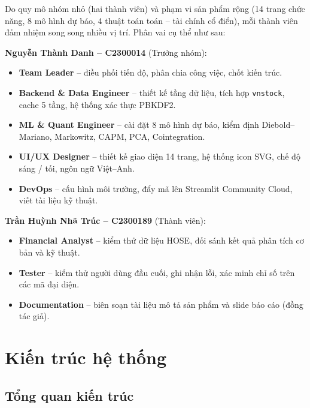 \documentclass[12pt,a4paper,openany,oneside]{report}
\numberwithin{equation}{chapter}
\begin{document}
\indent Do quy mô nhóm nhỏ (hai thành viên) và phạm vi sản phẩm rộng
(14 trang chức năng, 8 mô hình dự báo, 4 thuật toán toán -- tài chính
cổ điển), mỗi thành viên đảm nhiệm song song nhiều vị trí. Phân vai cụ
thể như sau:

\vspace{4pt}
\noindent\textbf{Nguyễn Thành Danh -- C2300014} (Trưởng nhóm):
\begin{itemize}[leftmargin=22pt,topsep=2pt,itemsep=2pt]
  \item \textbf{Team Leader} -- điều phối tiến độ, phân chia công việc,
        chốt kiến trúc.
  \item \textbf{Backend \& Data Engineer} -- thiết kế tầng dữ liệu, tích
        hợp \texttt{vnstock}, cache 5 tầng, hệ thống xác thực PBKDF2.
  \item \textbf{ML \& Quant Engineer} -- cài đặt 8 mô hình dự báo, kiểm
        định Diebold--Mariano, Markowitz, CAPM, PCA, Cointegration.
  \item \textbf{UI/UX Designer} -- thiết kế giao diện 14 trang, hệ thống
        icon SVG, chế độ sáng / tối, ngôn ngữ Việt--Anh.
  \item \textbf{DevOps} -- cấu hình môi trường, đẩy mã lên Streamlit
        Community Cloud, viết tài liệu kỹ thuật.
\end{itemize}

\vspace{4pt}
\noindent\textbf{Trần Huỳnh Nhã Trúc -- C2300189} (Thành viên):
\begin{itemize}[leftmargin=22pt,topsep=2pt,itemsep=2pt]
  \item \textbf{Financial Analyst} -- kiểm thử dữ liệu HOSE, đối sánh
        kết quả phân tích cơ bản và kỹ thuật.
  \item \textbf{Tester} -- kiểm thử người dùng đầu cuối, ghi nhận lỗi,
        xác minh chỉ số trên các mã đại diện.
  \item \textbf{Documentation} -- biên soạn tài liệu mô tả sản phẩm và
        slide báo cáo (đồng tác giả).
\end{itemize}

\chapter{Kiến trúc hệ thống}

\section{Tổng quan kiến trúc}
\end{document}
